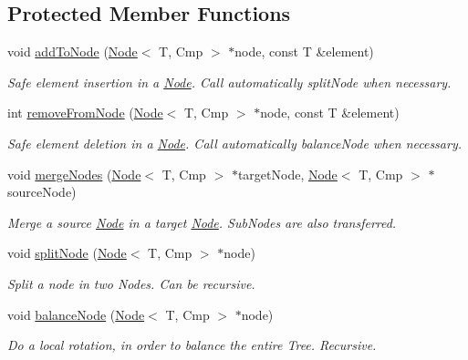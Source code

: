 \subsection*{Protected Member Functions}
\begin{DoxyCompactItemize}
\item 
\hypertarget{classBTree_abfec9fc638844e35afc65644ac18efc4}{
void \hyperlink{classBTree_abfec9fc638844e35afc65644ac18efc4}{addToNode} (\hyperlink{classNode}{Node}$<$ T, Cmp $>$ $\ast$node, const T \&element)}
\label{classBTree_abfec9fc638844e35afc65644ac18efc4}

\begin{DoxyCompactList}\small\item\em Safe element insertion in a \hyperlink{classNode}{Node}. Call automatically splitNode when necessary. \item\end{DoxyCompactList}\item 
\hypertarget{classBTree_a987f244ae4a949d2a8bfc37fbb3f6bd1}{
int \hyperlink{classBTree_a987f244ae4a949d2a8bfc37fbb3f6bd1}{removeFromNode} (\hyperlink{classNode}{Node}$<$ T, Cmp $>$ $\ast$node, const T \&element)}
\label{classBTree_a987f244ae4a949d2a8bfc37fbb3f6bd1}

\begin{DoxyCompactList}\small\item\em Safe element deletion in a \hyperlink{classNode}{Node}. Call automatically balanceNode when necessary. \item\end{DoxyCompactList}\item 
void \hyperlink{classBTree_a17124d656659761322bf2a5d175225e0}{mergeNodes} (\hyperlink{classNode}{Node}$<$ T, Cmp $>$ $\ast$targetNode, \hyperlink{classNode}{Node}$<$ T, Cmp $>$ $\ast$sourceNode)
\begin{DoxyCompactList}\small\item\em Merge a source \hyperlink{classNode}{Node} in a target \hyperlink{classNode}{Node}. SubNodes are also transferred. \item\end{DoxyCompactList}\item 
void \hyperlink{classBTree_aa4d84b1d728a3d4b170821c14cb82d0d}{splitNode} (\hyperlink{classNode}{Node}$<$ T, Cmp $>$ $\ast$node)
\begin{DoxyCompactList}\small\item\em Split a node in two Nodes. Can be recursive. \item\end{DoxyCompactList}\item 
void \hyperlink{classBTree_ae570a4fc2d1bae09283bbe185a8269c6}{balanceNode} (\hyperlink{classNode}{Node}$<$ T, Cmp $>$ $\ast$node)
\begin{DoxyCompactList}\small\item\em Do a local rotation, in order to balance the entire Tree. Recursive. \item\end{DoxyCompactList}\end{DoxyCompactItemize}


